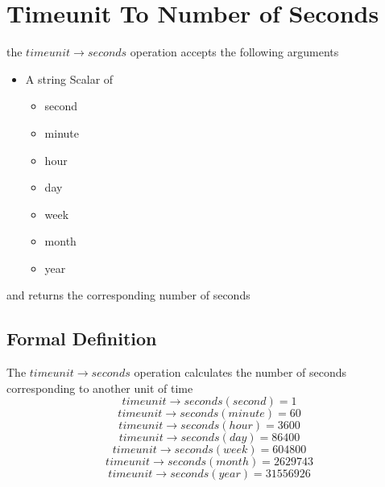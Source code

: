 \documentclass[../../main.tex]{subfiles}
\begin{document}
\section{Timeunit To Number of Seconds}

the $timeunit \to seconds$ operation accepts the following arguments

\begin{itemize}
\item A string Scalar of
  \begin{itemize}
  \item second
  \item minute
  \item hour
  \item day
  \item week
  \item month
  \item year
  \end{itemize}
\end{itemize}
and returns the corresponding number of seconds

\subsection{Formal Definition}

The $timeunit \to seconds$ operation calculates the number of seconds corresponding to another unit of time
$$timeunit \to seconds(second) = 1$$
$$timeunit \to seconds(minute) = 60$$
$$timeunit \to seconds(hour) = 3600$$
$$timeunit \to seconds(day) = 86400$$
$$timeunit \to seconds(week) = 604800$$
$$timeunit \to seconds(month) = 2629743$$
$$timeunit \to seconds(year) = 31556926$$
\end{document}
